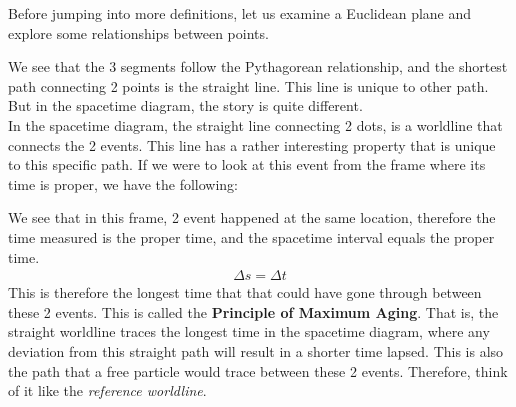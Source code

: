 \documentclass[11pt,letterpaper]{book}
\begin{document}
\begin{center}
\end{center}
Before jumping into more definitions, let us examine a Euclidean plane and explore some relationships between points.
\begin{center}
\end{center}
We see that the 3 segments follow the Pythagorean relationship, and the shortest path connecting 2 points is the straight line. This line is unique to other path. But in the spacetime diagram, the story is quite different. \\

In the spacetime diagram, the straight line connecting 2 dots, is a worldline that connects the 2 events. This line has a rather interesting property that is unique to this specific path. If we were to look at this event from the frame where its time is proper, we have the following:
\begin{center}
\end{center}
We see that in this frame, 2 event happened at the same location, therefore the time measured is the proper time, and the spacetime interval equals the proper time.
\begin{align}
\Delta s = \Delta t
\end{align}
This is therefore the longest time that that could have gone through between these 2 events. This is called the \textbf{Principle of Maximum Aging}. That is, the straight worldline traces the longest time in the spacetime diagram, where any deviation from this straight path will result in a shorter time lapsed. This is also the path that a free particle would trace between these 2 events. Therefore, think of it like the \textit{reference worldline}.\\
\end{document}
